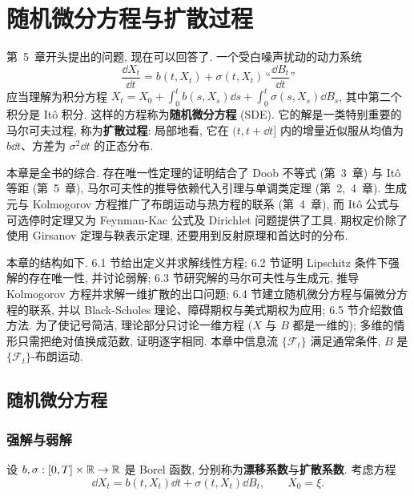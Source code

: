 \chapter{随机微分方程与扩散过程}
\label{ch:6}

第~5~章开头提出的问题, 现在可以回答了. 一个受白噪声扰动的动力系统
\[
\frac{\dd X_t}{\dd t}=b(t,X_t)+\sigma(t,X_t)\,\text{``}\frac{\dd B_t}{\dd t}\text{''}
\]
应当理解为积分方程 $X_t=X_0+\int_0^tb(s,X_s)\dd s+\int_0^t\sigma(s,X_s)\dd B_s$, 其中第二个积分是 It\^o 积分. 这样的方程称为\textbf{随机微分方程} (SDE). 它的解是一类特别重要的马尔可夫过程, 称为\textbf{扩散过程}: 局部地看, 它在 $(t,t+\dd t]$ 内的增量近似服从均值为 $b\dd t$、方差为 $\sigma^2\dd t$ 的正态分布.

本章是全书的综合. 存在唯一性定理的证明结合了 Doob 不等式 (第~3~章) 与 It\^o 等距 (第~5~章), 马尔可夫性的推导依赖代入引理与单调类定理 (第~2,~4~章). 生成元与 Kolmogorov 方程推广了布朗运动与热方程的联系 (第~4~章), 而 It\^o 公式与可选停时定理又为 Feynman-Kac 公式及 Dirichlet 问题提供了工具. 期权定价除了使用 Girsanov 定理与鞅表示定理, 还要用到反射原理和首达时的分布.

本章的结构如下. 6.1 节给出定义并求解线性方程; 6.2 节证明 Lipschitz 条件下强解的存在唯一性, 并讨论弱解; 6.3 节研究解的马尔可夫性与生成元, 推导 Kolmogorov 方程并求解一维扩散的出口问题; 6.4 节建立随机微分方程与偏微分方程的联系, 并以 Black-Scholes 理论、障碍期权与美式期权为应用; 6.5 节介绍数值方法. 为了使记号简洁, 理论部分只讨论一维方程 ($X$ 与 $B$ 都是一维的); 多维的情形只需把绝对值换成范数, 证明逐字相同. 本章中信息流 $\{\mathcal{F}_t\}$ 满足通常条件, $B$ 是 $\{\mathcal{F}_t\}$-布朗运动.

\section{随机微分方程}
\label{sec:6-1}

\subsection{强解与弱解}

设 $b,\sigma:[0,T]\times\mathbb{R}\to\mathbb{R}$ 是 Borel 函数, 分别称为\textbf{漂移系数}与\textbf{扩散系数}. 考虑方程
\begin{equation}\label{eq:sde}
\dd X_t=b(t,X_t)\dd t+\sigma(t,X_t)\dd B_t,\qquad X_0=\xi.
\end{equation}

